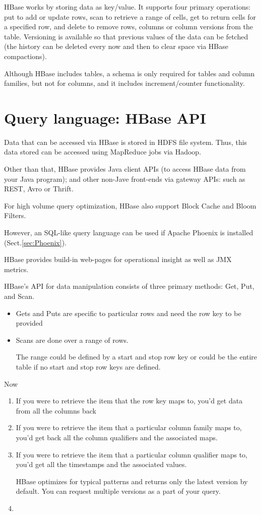 HBase works by storing data as key/value. It supports four primary operations:
put to add or update rows, scan to retrieve a range of cells, get to return
cells for a specified row, and delete to remove rows, columns or column versions
from the table. Versioning is available so that previous values of the data can
be fetched (the history can be deleted every now and then to clear space via
HBase compactions).     

Although HBase includes tables, a schema is only required for tables and column
families, but not for columns, and it includes increment/counter functionality. 
 
\section{Query language: HBase API}
\label{sec:query-HBase}

Data that can be accessed via HBase is stored in HDFS file system.
Thus, this data stored can be accessed using MapReduce jobs via Hadoop.

Other than that, HBase provides Java client APIs (to access HBase data from your
Java program); and other non-Jave front-ends via gateway APIs: such as REST,
Avro or Thrift. 

For high volume query optimization, HBase also support Block Cache and Bloom
Filters. 

However, an SQL-like query language can be used if Apache Phoenix is installed (Sect.\ref{sec:Phoenix}).

HBase provides build-in web-pages for operational insight as well as JMX
metrics.

HBase's API for data manipulation consists of three primary methods: Get, Put,
and Scan.
\begin{itemize}
  \item Gets and
Puts are specific to particular rows and need the row key to be provided
  \item Scans are
done over a range of rows.

The range could be defined by a start and stop row key or
could be the entire table if no start and stop row keys are defined.
\end{itemize}


Now
\begin{enumerate}
  \item If you were to retrieve the item that the row key maps to, you'd get data from
all the columns back
 
  \item If you were to retrieve the item that a particular column
family maps to, you'd get back all the column qualifiers and the associated maps.

  \item If you were to retrieve the item that a particular column qualifier maps to, you'd get
all the timestamps and the associated values.

HBase optimizes for typical patterns and returns only the latest version by default.
You can request multiple versions as a part of your query.

  \item  
\end{enumerate}

